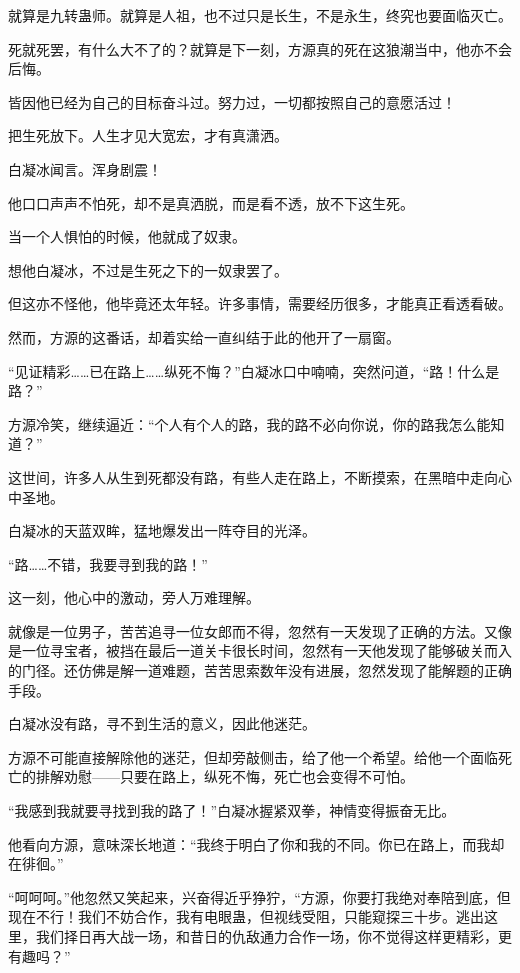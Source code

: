 \begin{this_body}
就算是九转蛊师。就算是人祖，也不过只是长生，不是永生，终究也要面临灭亡。

死就死罢，有什么大不了的？就算是下一刻，方源真的死在这狼潮当中，他亦不会后悔。

皆因他已经为自己的目标奋斗过。努力过，一切都按照自己的意愿活过！

把生死放下。人生才见大宽宏，才有真潇洒。

白凝冰闻言。浑身剧震！

他口口声声不怕死，却不是真洒脱，而是看不透，放不下这生死。

当一个人惧怕的时候，他就成了奴隶。

想他白凝冰，不过是生死之下的一奴隶罢了。

但这亦不怪他，他毕竟还太年轻。许多事情，需要经历很多，才能真正看透看破。

然而，方源的这番话，却着实给一直纠结于此的他开了一扇窗。

“见证精彩……已在路上……纵死不悔？”白凝冰口中喃喃，突然问道，“路！什么是路？”

方源冷笑，继续逼近：“个人有个人的路，我的路不必向你说，你的路我怎么能知道？”

这世间，许多人从生到死都没有路，有些人走在路上，不断摸索，在黑暗中走向心中圣地。

白凝冰的天蓝双眸，猛地爆发出一阵夺目的光泽。

“路……不错，我要寻到我的路！”

这一刻，他心中的激动，旁人万难理解。

就像是一位男子，苦苦追寻一位女郎而不得，忽然有一天发现了正确的方法。又像是一位寻宝者，被挡在最后一道关卡很长时间，忽然有一天他发现了能够破关而入的门径。还仿佛是解一道难题，苦苦思索数年没有进展，忽然发现了能解题的正确手段。

白凝冰没有路，寻不到生活的意义，因此他迷茫。

方源不可能直接解除他的迷茫，但却旁敲侧击，给了他一个希望。给他一个面临死亡的排解劝慰——只要在路上，纵死不悔，死亡也会变得不可怕。

“我感到我就要寻找到我的路了！”白凝冰握紧双拳，神情变得振奋无比。

他看向方源，意味深长地道：“我终于明白了你和我的不同。你已在路上，而我却在徘徊。”

“呵呵呵。”他忽然又笑起来，兴奋得近乎狰狞，“方源，你要打我绝对奉陪到底，但现在不行！我们不妨合作，我有电眼蛊，但视线受阻，只能窥探三十步。逃出这里，我们择日再大战一场，和昔日的仇敌通力合作一场，你不觉得这样更精彩，更有趣吗？”


\end{this_body}
